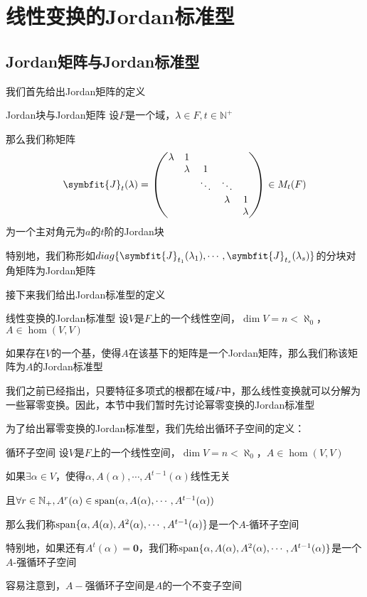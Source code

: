\documentclass[12pt, a4paper, oneside, UTF8]{ctexbook}
\begin{document}
	\section{线性变换的Jordan标准型}
		\subsection{Jordan矩阵与Jordan标准型}
			我们首先给出Jordan矩阵的定义
			\begin{defn}{Jordan块与Jordan矩阵}{}
				设$F$是一个域，$\lambda \in F,t \in \mathbb{N}^+$

				那么我们称矩阵
				\begin{equation}
					\symbfit{J}_t(\lambda )=\begin{pmatrix}
						\lambda & 1 &  &  &  \\
						 & \lambda & 1 &  &  \\
						 &  & \ddots & \ddots &  \\
						 &  &  & \lambda & 1 \\
						 &  &  &  & \lambda 
					\end{pmatrix} \in M_t(F)
				\end{equation}
				为一个主对角元为$a$的$t$阶的Jordan块

				特别地，我们称形如$diag\{\symbfit{J}_{t_1}(\lambda_1),\cdots,\symbfit{J}_{t_s}(\lambda_s)\}$的分块对角矩阵为Jordan矩阵
			\end{defn}
			接下来我们给出Jordan标准型的定义
			\begin{defn}{线性变换的Jordan标准型}{}
				设$V$是$F$上的一个线性空间，$\dim V = n < \aleph_0$，$A \in \hom(V,V)$

				如果存在$V$的一个基，使得$A$在该基下的矩阵是一个Jordan矩阵，那么我们称该矩阵为$A$的Jordan标准型
			\end{defn}
			我们之前已经指出，只要特征多项式的根都在域$F$中，那么线性变换就可以分解为一些幂零变换。因此，本节中我们暂时先讨论幂零变换的Jordan标准型

			为了给出幂零变换的Jordan标准型，我们先给出循环子空间的定义：
			\begin{defn}{循环子空间}{}
				设$V$是$F$上的一个线性空间，$\dim V = n < \aleph_0$，$A \in \hom(V,V)$
				
				如果$\exists \alpha  \in V$，使得$\alpha ,A(\alpha ),\cdots,A^{t-1}(\alpha )$线性无关

				且$\forall r \in \mathbb{N}_+,A^r(\alpha ) \in \operatorname{span}(\alpha ,A(\alpha ),\cdots,A^{t-1}(\alpha ))$

				那么我们称$\operatorname{span}\{\alpha ,A(\alpha ),A^2(\alpha ),\cdots,A^{t-1}(\alpha )\}$是一个$A$-循环子空间

				特别地，如果还有$A^t(\alpha )=\mathbf{0}$，我们称$\operatorname{span}\{\alpha ,A(\alpha ),A^2(\alpha ),\cdots,A^{t-1}(\alpha )\}$是一个$A$-强循环子空间
			\end{defn}
			容易注意到，$A-$强循环子空间是$A$的一个不变子空间
\end{document}
